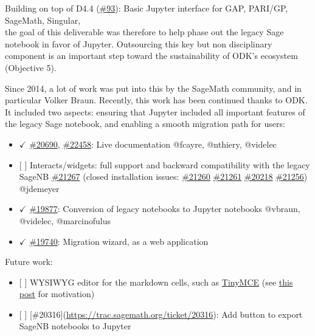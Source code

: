 Building on top of D4.4
(\href{https://github.com/OpenDreamKit/OpenDreamKit/issues/93}{\#93}):
Basic Jupyter interface for GAP, PARI/GP, SageMath, Singular,\\
the goal of this deliverable was therefore to help phase out the legacy
Sage notebook in favor of Jupyter. Outsourcing this key but non
disciplinary component is an important step toward the sustainability of
ODK's ecosystem (Objective 5).

Since 2014, a lot of work was put into this by the SageMath community,
and in particular Volker Braun. Recently, this work has been continued
thanks to ODK. It included two aspects: ensuring that Jupyter included
all important features of the legacy Sage notebook, and enabling a
smooth migration path for users:

\begin{itemize}
\tightlist
\item
  \(\checkmark\) \href{http://trac.sagemath.org/ticket/20690}{\#20690},
  \href{http://trac.sagemath.org/ticket/22458}{\#22458}: Live
  documentation @fcayre, @nthiery, @videlec
\item
  {[} {]} Interacts/widgets: full support and backward compatibility
  with the legacy SageNB
  \href{https://trac.sagemath.org/ticket/21267}{\#21267} (closed
  installation issues:
  \href{https://trac.sagemath.org/ticket/21260}{\#21260}
  \href{https://trac.sagemath.org/ticket/21261}{\#21261}
  \href{https://trac.sagemath.org/ticket/20218}{\#20218}
  \href{https://trac.sagemath.org/ticket/21256}{\#21256}) @jdemeyer
\item
  \(\checkmark\) \href{https://trac.sagemath.org/ticket/19877}{\#19877}:
  Conversion of legacy notebooks to Jupyter notebooks @vbraun, @videlec,
  @marcinofulus
\item
  \(\checkmark\) \href{https://trac.sagemath.org/ticket/19740}{\#19740}:
  Migration wizard, as a web application
\end{itemize}

Future work:

\begin{itemize}
\tightlist
\item
  {[} {]} WYSIWYG editor for the markdown cells, such as
  \href{https://www.tinymce.com/}{TinyMCE} (see
  \href{https://groups.google.com/d/msg/sage-devel/t11JSxxCgpw/BR0Bt638AgAJ}{this
  post} for motivation)
\item
  {[} {]} {[}\#20316{]}(\url{https://trac.sagemath.org/ticket/20316}):
  Add button to export SageNB notebooks to Jupyter
\end{itemize}
